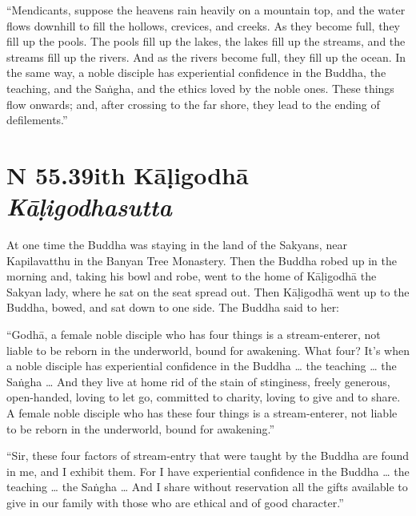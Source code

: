 \documentclass[12pt,openany]{book}%
\newcommand*{\suttatitleacronym}[1]{\smaller[2]{#1}\vspace*{.3em}}
\newcommand*{\suttatitletranslation}[1]{\linebreak{#1}}
\newcommand*{\suttatitleroot}[1]{\linebreak\smaller[2]\itshape{#1}}
\newcommand*{\tocacronym}[1]{\hspace*{-3.3em}{#1}\quad}
\newcommand*{\toctranslation}[1]{#1}
\newcommand*{\tocroot}[1]{(\textit{#1})}
\begin{document}
“Mendicants, suppose the heavens rain heavily on a mountain top, and the water flows downhill to fill the hollows, crevices, and creeks. As they become full, they fill up the pools. The pools fill up the lakes, the lakes fill up the streams, and the streams fill up the rivers. And as the rivers become full, they fill up the ocean. In the same way, a noble disciple has experiential confidence in the Buddha, the teaching, and the \textsanskrit{Saṅgha}, and the ethics loved by the noble ones. These things flow onwards; and, after crossing to the far shore, they lead to the ending of defilements.” 

%
\section*{{\suttatitleacronym SN 55.39}{\suttatitletranslation With Kāḷigodhā }{\suttatitleroot Kāḷigodhasutta}}
\addcontentsline{toc}{section}{\tocacronym{SN 55.39} \toctranslation{With Kāḷigodhā } \tocroot{Kāḷigodhasutta}}

At one time the Buddha was staying in the land of the Sakyans, near Kapilavatthu in the Banyan Tree Monastery. Then the Buddha robed up in the morning and, taking his bowl and robe, went to the home of \textsanskrit{Kāḷigodhā} the Sakyan lady, where he sat on the seat spread out. Then \textsanskrit{Kāḷigodhā} went up to the Buddha, bowed, and sat down to one side. The Buddha said to her: 

“\textsanskrit{Godhā}, a female noble disciple who has four things is a stream-enterer, not liable to be reborn in the underworld, bound for awakening. What four? It’s when a noble disciple has experiential confidence in the Buddha … the teaching … the \textsanskrit{Saṅgha} … And they live at home rid of the stain of stinginess, freely generous, open-handed, loving to let go, committed to charity, loving to give and to share. A female noble disciple who has these four things is a stream-enterer, not liable to be reborn in the underworld, bound for awakening.” 

“Sir, these four factors of stream-entry that were taught by the Buddha are found in me, and I exhibit them. For I have experiential confidence in the Buddha … the teaching … the \textsanskrit{Saṅgha} … And I share without reservation all the gifts available to give in our family with those who are ethical and of good character.” 
\end{document}
